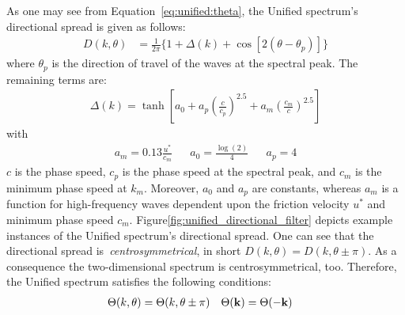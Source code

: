 As one may see from Equation~\ref{eq:unified:theta}, the Unified spectrum's
directional spread is given as follows:
%
\begin{align}
D(k, \theta) &= \frac{1}{2\pi}\{1 + \Delta(k) + \cos[2(\theta - 
\theta_p)]\}
\end{align}
where $\theta_p$ is the direction of travel of the waves at the spectral peak.
The remaining terms are:
\begin{align*}
\Delta(k) = \tanh\left[a_0 + a_p\left(\frac{c}{c_p}\right)^{2.5} + 
a_m\left(\frac{c_m}{c}\right)^{2.5}\right]
\end{align*}
with
\begin{align*}
a_m = 0.13 \frac{u^{\ast}}{c_m} && a_0 = \frac{\log(2)}{4} && a_p = 4
\end{align*}
$c$ is the phase speed, $c_p$ is the phase speed at the spectral peak, and $c_m$
is the minimum phase speed at $k_m$. Moreover, $a_0$ and $a_p$ are constants,
whereas $a_m$ is a function for high-frequency waves dependent upon the friction
velocity $u^\ast$ and minimum phase speed $c_m$.
Figure\ref{fig:unified_directional_filter} depicts example
instances of the Unified spectrum's directional spread. One can see that the
directional spread is~\emph{centrosymmetrical}, in short
$D(k, \theta) = D(k, \theta \pm \pi)$. As a consequence the two-dimensional
\wavenumber spectrum is centrosymmetrical, too. Therefore, the Unified spectrum
satisfies the following conditions:
\begin{align*}
\Theta(k, \theta) &= \Theta(k, \theta \pm \pi) & \Theta(\mathbf{k}) &= \Theta(-\mathbf{k})
\end{align*}
%
